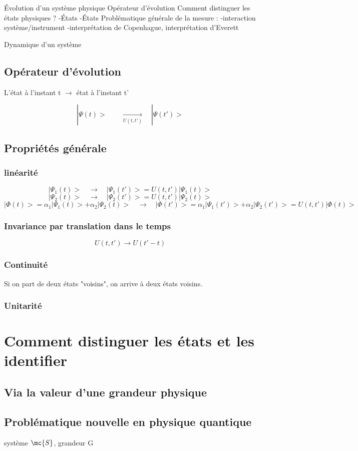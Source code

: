 
Évolution d'un système physique
Opérateur d'évolution
Comment  distinguer les états physiques ?
-États
-États
Problématique générale de la mesure :
-interaction système/instrument
-interprétation de Copenhague, interprétation d'Everett

Dynamique d'un système

\subsection{Opérateur d'évolution}
\begin{center}
L'état à l'instant t $\to$ état à l'instant t'
\end{center}
\[
|\Psi(t)>\qquad\xrightarrow[U(t,t')]{}\quad|\Psi(t')>
\]
\subsection{Propriétés générale}
\subsubsection{linéarité}
\[
|\Psi_1(t)>\quad\to\quad|\Psi_1(t')> = U(t,t')|\Psi_1(t)>
\]
\[
|\Psi_2(t)>\quad\to\quad|\Psi_2(t')> = U(t,t')|\Psi_2(t)>
\]
\[
|\Phi(t)>=\alpha_1|\Psi_1(t)>+\alpha_2|\Psi_2(t)>\quad\to\quad
|\Phi(t')>=\alpha_1|\Psi_1(t')>+\alpha_2|\Psi_2(t')> = U(t,t')|\Phi(t)>
\]

\subsubsection{Invariance par translation dans le temps}

\[
U(t,t') \to U(t'-t)
\]

\subsubsection{Continuité}
Si on part de deux états "voisins", on arrive à deux états voisins.

\subsubsection{Unitarité}

\section{Comment distinguer les états et les identifier}

\subsection{Via la valeur d'une grandeur physique}

\subsection{Problématique nouvelle en physique quantique}

système $\mc{S}$, grandeur G 

